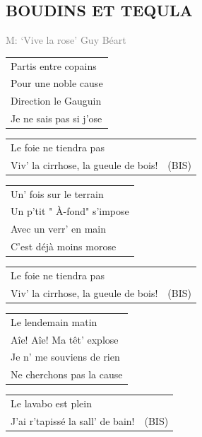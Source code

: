 \documentclass[a4paper, 14pt]{extarticle}
\begin{document}
\subsection*{BOUDINS ET TEQULA}
\textcolor{gray}{\small M: ‘Vive la rose’ Guy Béart}
\par
\begin{flushleft}
\begin{tabularx}{0.8\textwidth} {
   >{\raggedright\arraybackslash}X}
Partis entre copains\\
Pour une noble cause\\
Direction le Gauguin\\
Je ne sais pas si j’ose\\
\end{tabularx}
\begin{tabularx}{0.8\textwidth} {
   >{\raggedright\arraybackslash}X | c}
Le foie ne tiendra pas & \\
Viv’ la cirrhose, la gueule de bois! & (BIS)\\
\end{tabularx}
\end{flushleft}
\begin{flushleft}
\begin{tabularx}{0.8\textwidth} {
   >{\raggedright\arraybackslash}X}
Un’ fois sur le terrain \\
Un p’tit " À-fond" s’impose \\
Avec un verr’ en main \\
C’est déjà moins morose \\
\end{tabularx}
\begin{tabularx}{0.8\textwidth} {
   >{\raggedright\arraybackslash}X | c}
Le foie ne tiendra pas & \\
Viv’ la cirrhose, la gueule de bois! & (BIS)\\
\end{tabularx}
\end{flushleft}
\begin{flushleft}
\begin{tabularx}{0.8\textwidth} {
   >{\raggedright\arraybackslash}X}
Le lendemain matin \\
Aîe! Aîe! Ma têt’ explose \\
Je n’ me souviens de rien \\
Ne cherchons pas la cause \\
\end{tabularx}
\begin{tabularx}{0.8\textwidth} {
   >{\raggedright\arraybackslash}X | c}
Le lavabo est plein & \\
J’ai r’tapissé la sall’ de bain! & (BIS)\\
\end{tabularx}
\end{flushleft}
\end{document}
